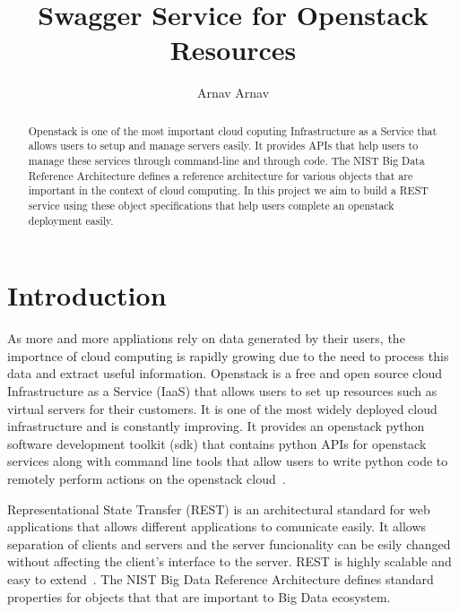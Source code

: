 \title{Swagger Service for Openstack Resources}


\author{Arnav Arnav}


\renewcommand{\shortauthors}{Arnav}


\begin{abstract}
Openstack is one of the most important cloud coputing Infrastructure
as a Service that allows users to setup and manage servers easily. It
provides APIs that help users to manage these services through
command-line and through code. The NIST Big Data Reference
Architecture defines a reference architecture for various objects that
are important in the context of cloud computing. In this project we
aim to build a REST service using these object specifications that
help users complete an openstack deployment easily.
\end{abstract}



\maketitle

\section{Introduction}
As more and more appliations rely on data generated by their users,
the importnce of cloud computing is rapidly growing due to the need to
process this data and extract useful information.  Openstack is a free
and open source cloud Infrastructure as a Service (IaaS) that allows
users to set up resources such as virtual servers for their
customers. It is one of the most widely deployed cloud infrastructure
and is constantly improving. It provides an openstack python software
development toolkit (sdk) that contains python APIs for openstack
services along with command line tools that allow users to write
python code to remotely perform actions on the openstack
cloud~\cite{hid-sp18-503-openstack-wiki}.

Representational State Transfer (REST) is an architectural standard
for web applications that allows different applications to comunicate
easily. It allows separation of clients and servers and the server
funcionality can be esily changed without affecting the client's
interface to the server. REST is highly scalable and easy to
extend~\cite{hid-sp18-503-REST}. The NIST Big Data Reference
Architecture defines standard properties for objects that that are
important to Big Data ecosystem.


